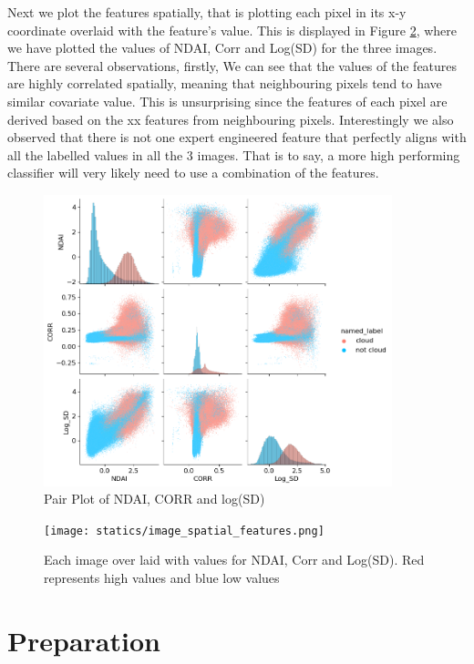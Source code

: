 \documentclass[11pt, letterpaper, journal]{IEEEtran}
\begin{document}
Next we plot the features spatially, that is plotting each pixel in its x-y coordinate overlaid with the feature's value. This is displayed in Figure \ref{fig:spatial_dist_covariates}, where we have plotted the values of NDAI, Corr and Log(SD) for the three images. There are several observations, firstly, We can see that the values of the features are highly correlated spatially, meaning that neighbouring pixels tend to have similar covariate value. This is unsurprising since the features of each pixel are derived based on the xx features from neighbouring pixels. Interestingly we also observed that there is not one expert engineered feature that perfectly aligns with all the labelled values in all the 3 images. That is to say, a more high performing classifier will very likely need to use a combination of the features.


\begin{figure}[!h]
\centering
\includegraphics[width=0.9\textwidth]{statics/example_pair_plot.png}
\caption{Pair Plot of NDAI, CORR and log(SD)}
\label{fig:covariate_dist}
\end{figure}

\begin{figure}[!h]
\centering
\texttt{[image: statics/image\_spatial\_features.png]}
\caption{Each image over laid with values for NDAI, Corr and Log(SD). Red represents high values and blue low values}
\label{fig:spatial_dist_covariates}
\end{figure}


\section{Preparation}
\end{document}
